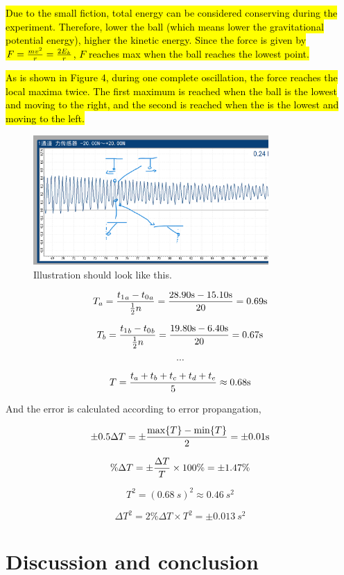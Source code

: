 \documentclass[a4paper]{article}
\begin{document}
\hl{Due to the small fiction, total energy can be considered conserving during the experiment. Therefore, lower the ball (which means lower the gravitational potential energy), higher the kinetic energy. Since the force is given by $F={mv^2\over r}={2E_k\over r}$, $F$ reaches max when the ball reaches the lowest point.}

\hl{As is shown in Figure 4, during one complete oscillation, the force reaches the local maxima twice. The first maximum is reached when the ball is the lowest and moving to the right, and the second is reached when the is the lowest and moving to the left.}

\begin{figure}
    \centering
    \includegraphics[width=0.8\textwidth]{add.png}
    \caption{Illustration should look like this.}
    \label{fig.ill}
\end{figure}

$$T_a = {{t_1}_a - {t_0}_a \over \frac{1}{2}n} = {28.90 \SI{}{s} - 15.10 \SI{}{s} \over 20} = 0.69 \SI{}{s}$$

$$T_b = {{t_1}_b - {t_0}_b \over \frac{1}{2}n} ={ 19.80 \SI{}{s} - 6.40 \SI{}{s} \over 20} = 0.67 \SI{}{s}$$

$$\cdots$$

$$T = {t_a + t_b + t_c + t_d + t_e \over 5} \approx 0.68 \SI{}{s}$$

And the error is calculated according to error propangation,

$$\pm 0.5 \Delta T = \pm {\max\{T\} - \min\{T\} \over 2} = \pm 0.01 \SI{}{s}$$

$$\%\Delta T = \pm {\Delta T \over T} \times 100\% = \pm 1.47\%$$

$$T^2 = (0.68 \SI{}{s})^2 \approx 0.46 \SI{}{s^2}$$

$$\Delta T^2 = 2\%\Delta T \times T^2 = \pm 0.013 \SI{}{s^2}$$

\section{Discussion and conclusion}
\end{document}
